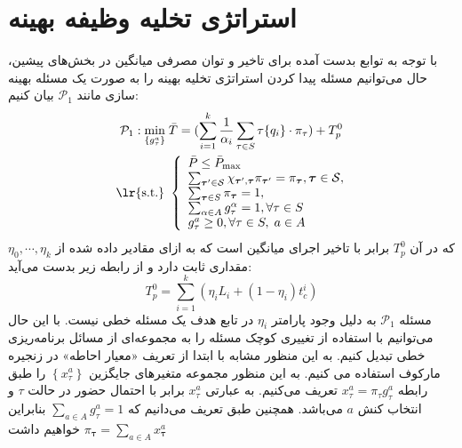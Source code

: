 \section{استراتژی تخلیه وظیفه بهینه}
\label{sec:strat}
با توجه به توابع بدست آمده برای تاخیر و توان مصرفی میانگین در بخش‌های پیشین، حال می‌توانیم مسئله پیدا کردن استراتژی تخلیه بهینه را به صورت یک مسئله بهینه سازی مانند
$\mathcal{P}_{1}$
بیان کنیم:
\begin{equation}
		\begin{aligned}
			\mathcal{P}_{1}: \min _{\left\{g_{\tau}^{a}\right\}}\; & \bar{T} = (\sum_{i=1}^{k} \frac{1}{\alpha_i} \sum_{\tau \in S} \tau\{q_i\} \cdot \pi_{\tau}) + T_p^0 \\
			\text { \lr{s.t.} } &\left\{\begin{array}{l}
				\bar{P} \leq \bar{P}_{\max } \\
				\sum_{\boldsymbol{\tau}^{\prime} \in \mathcal{S}} \chi_{\boldsymbol{\tau}^{\prime}, \boldsymbol{\tau}} \pi_{\boldsymbol{\tau}^{\prime}}=\pi_{\boldsymbol{\tau}}, \boldsymbol{\tau} \in \mathcal{S}, \\
				\sum_{\boldsymbol{\tau} \in S} \pi_{\boldsymbol{\tau}}=1, \\
				\sum_{\alpha \in A} g_{\tau}^{\alpha}=1, \forall \tau \in S\\
				g_{\tau}^{a} \geq 0, \forall \tau \in S,\;a \in A
			\end{array}\right.
		\end{aligned}
\end{equation}
که در آن
$T_p^0$
برابر با تاخیر اجرای میانگین است که به ازای مقادیر داده شده از
$\eta_0, \cdots, \eta_k$
مقداری ثابت دارد و از رابطه زیر بدست می‌آید:
\begin{equation}
	T_p^0 = \sum_{i=1}^{k} (\eta_i L_i+(1-\eta_i) t_{c}^i)
\end{equation}
\clearpage
مسئله
$\mathcal{P}_{1}$
به دلیل وجود پارامتر $\eta_i$ در تابع هدف یک مسئله خطی نیست. با این حال می‌توانیم با استفاده از تغییری کوچک مسئله را به مجموعه‌ای از مسائل برنامه‌ریزی خطی تبدیل کنیم. به این منظور مشابه با \cite{Liu} ابتدا از تعریف «معیار احاطه» در زنجیره مارکوف استفاده می کنیم. به این منظور مجموعه متغیرهای جایگزین $\left\{x_{\tau}^{a}\right\}$ را طبق رابطه $x_{\tau}^{a}=\pi_{\tau} g_{\tau}^{a}$ تعریف می‌کنیم. به عبارتی $x_{\tau}^{a}$ برابر با احتمال حضور در حالت $\tau$ و انتخاب کنش
$a$
می‌باشد. همچنین طبق تعریف می‌دانیم که
$\sum_{a \in A} g_{\tau}^{a}=1$
بنابراین خواهیم داشت
$\pi_{\boldsymbol{\tau}}=\sum_{a \in A} x_{\boldsymbol{\tau}}^{a}$
\\\\
